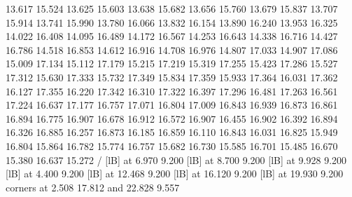 {        13.617 15.524
        13.625 15.603
        13.638 15.682
        13.656 15.760
        13.679 15.837
        13.707 15.914
        13.741 15.990
        13.780 16.066
        13.832 16.154
        13.890 16.240
        13.953 16.325
        14.022 16.408
        14.095 16.489
        14.172 16.567
        14.253 16.643
        14.338 16.716
        14.427 16.786
        14.518 16.853
        14.612 16.916
        14.708 16.976
        14.807 17.033
        14.907 17.086
        15.009 17.134
        15.112 17.179
        15.215 17.219
        15.319 17.255
        15.423 17.286
        15.527 17.312
        15.630 17.333
        15.732 17.349
        15.834 17.359
        15.933 17.364
        16.031 17.362
        16.127 17.355
        16.220 17.342
        16.310 17.322
        16.397 17.296
        16.481 17.263
        16.561 17.224
        16.637 17.177
        16.757 17.071
        16.804 17.009
        16.843 16.939
        16.873 16.861
        16.894 16.775
        16.907 16.678
        16.912 16.572
        16.907 16.455
        16.902 16.392
        16.894 16.326
        16.885 16.257
        16.873 16.185
        16.859 16.110
        16.843 16.031
        16.825 15.949
        16.804 15.864
        16.782 15.774
        16.757 15.682
        16.730 15.585
        16.701 15.485
        16.670 15.380
        16.637 15.272
        /
%
%
 [lB] at  6.970  9.200
%
%
 [lB] at  8.700  9.200
%
%
 [lB] at 9.928  9.200
%
%
 [lB] at  4.400  9.200
%
%
 [lB] at 12.468  9.200
%
%
 [lB] at 16.120  9.200
%
%
 [lB] at 19.930  9.200
\linethickness=0pt
\putrectangle corners at  2.508 17.812 and 22.828  9.557
\endpicture}
